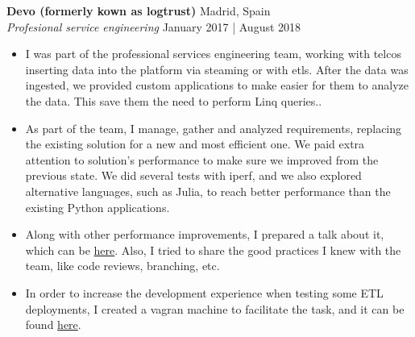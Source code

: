 \documentclass[a4paper]{article}
\begin{document}
\textbf{Devo (formerly kown as logtrust)} \hfill Madrid, Spain\\
\textit{Profesional service engineering} \hfill January 2017 | August 2018\\
\vspace{-1mm}
\begin{itemize} \itemsep 1pt
	\item I was part of the professional services engineering team, working with telcos inserting data into the platform via steaming or with etls.  After the data was ingested, we provided custom applications to make easier for them to analyze the data. This save them the need to perform Linq queries..
	\item As part of the team, I manage, gather and analyzed requirements, replacing the existing solution for a new and most efficient one.  We paid extra attention to solution's performance to make sure we improved from the previous state. We did several tests with iperf, and we also explored alternative languages, such as Julia, to reach better performance than the existing Python applications.
	\item Along with other performance improvements, I prepared a talk about it, which can be \href{https://github.com/dionisioC/pythonPerformance}{here}. Also, I tried to share the good practices I knew with the team, like code reviews, branching, etc.
	\item In order to increase the development experience when testing some ETL deployments, I created a vagran machine to facilitate the task, and it can be found \href{https://github.com/dionisioC/azkaban_in_vagrant_with_ansible}{here}. 

\end{itemize}
\end{document}
